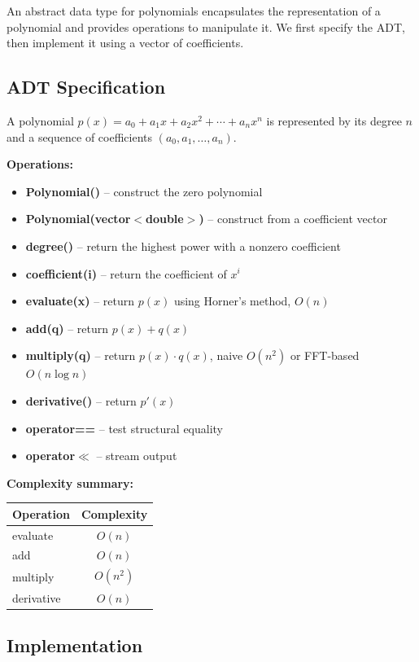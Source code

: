 An abstract data type for polynomials encapsulates the representation of a polynomial and provides operations to manipulate it. We first specify the ADT, then implement it using a vector of coefficients.

\subsection{ADT Specification}

A polynomial $p(x) = a_{0} + a_{1}x + a_{2}x^{2} + \cdots + a_{n}x^{n}$ is represented by its degree $n$ and a sequence of coefficients $(a_{0}, a_{1}, \ldots, a_{n})$.

\textbf{Operations:}
\begin{itemize}
\item \textbf{Polynomial()} -- construct the zero polynomial
\item \textbf{Polynomial(vector$<$double$>$)} -- construct from a coefficient vector
\item \textbf{degree()} -- return the highest power with a nonzero coefficient
\item \textbf{coefficient(i)} -- return the coefficient of $x^{i}$
\item \textbf{evaluate(x)} -- return $p(x)$ using Horner's method, $O(n)$
\item \textbf{add(q)} -- return $p(x) + q(x)$
\item \textbf{multiply(q)} -- return $p(x) \cdot q(x)$, naive $O(n^{2})$ or FFT-based $O(n \log n)$
\item \textbf{derivative()} -- return $p'(x)$
\item \textbf{operator==} -- test structural equality
\item \textbf{operator$\ll$} -- stream output
\end{itemize}

\textbf{Complexity summary:}
\begin{center}
\begin{tabular}{lc}
\toprule
Operation & Complexity \\
\midrule
evaluate & $O(n)$ \\
add & $O(n)$ \\
multiply & $O(n^{2})$ \\
derivative & $O(n)$ \\
\bottomrule
\end{tabular}
\end{center}

\subsection{Implementation}

